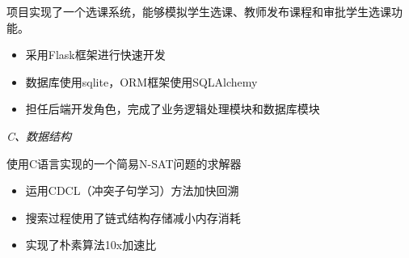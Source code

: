 \documentclass{uniquecv}
\begin{document}
项目实现了一个选课系统，能够模拟学生选课、教师发布课程和审批学生选课功能。
\begin{itemize}
  \item 采用Flask框架进行快速开发
  \item 数据库使用sqlite，ORM框架使用SQLAlchemy
  \item 担任后端开发角色，完成了业务逻辑处理模块和数据库模块
\end{itemize}

\medskip
\textit{C、数据结构}
\vspace{0.4ex}

使用C语言实现的一个简易N-SAT问题的求解器
\begin{itemize}
  \item 运用CDCL（冲突子句学习）方法加快回溯
  \item 搜索过程使用了链式结构存储减小内存消耗
  \item 实现了朴素算法10x加速比
\end{itemize}
\medskip


\end{document}
